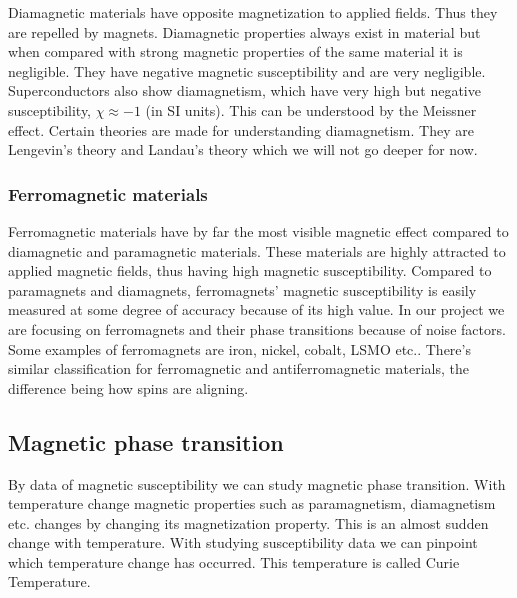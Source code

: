 Diamagnetic materials have opposite magnetization to applied fields. Thus they are repelled by magnets. Diamagnetic properties always exist in material but when compared with strong magnetic properties of the same material it is negligible. They have negative magnetic susceptibility and are very negligible. Superconductors also show diamagnetism, which have very high but negative susceptibility, $\chi \approx -1$ (in SI units). This can be understood by the Meissner effect. Certain theories are made for understanding diamagnetism. They are Lengevin’s theory and Landau’s theory which we will not go deeper for now.\cite{wikidia}

\subsubsection{Ferromagnetic materials}
Ferromagnetic materials have by far the most visible magnetic effect compared to diamagnetic and paramagnetic materials. These materials are highly attracted to applied magnetic fields, thus having high magnetic susceptibility. Compared to paramagnets and diamagnets, ferromagnets' magnetic susceptibility is easily measured at some degree of accuracy because of its high value. In our project we are focusing on ferromagnets and their phase transitions because of noise factors. Some examples of ferromagnets are iron, nickel, cobalt, LSMO etc.. There’s similar classification for ferromagnetic and antiferromagnetic materials, the difference being how spins are aligning. \cite{wikiferro}

\subsection{Magnetic phase transition}

By data of magnetic susceptibility we can study magnetic phase transition. With temperature change magnetic properties such as paramagnetism, diamagnetism etc. changes by changing its magnetization property. This is an almost sudden change with temperature. With studying susceptibility data we can pinpoint which temperature change has occurred. This temperature is called Curie Temperature.

